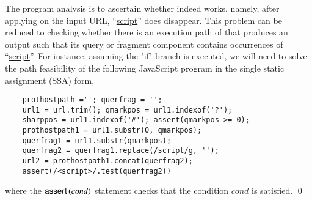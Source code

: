 \begin{example}
The program analysis is to ascertain whether {\urlxsssanitise} indeed works, namely, after applying {\urlxsssanitise} on the input URL, ``\url{script}'' does disappear.  This problem can be reduced to checking whether there is an execution path of {\urlxsssanitise} that produces an output such that its query or fragment component contains occurrences of ``\url{script}''. For instance, assuming  the "if" branch is executed, %
we will need to solve the path feasibility of the following JavaScript program in the single static assignment (SSA) form,

{\small
\begin{verbatim}
    prothostpath =''; querfrag = '';
    url1 = url.trim(); qmarkpos = url1.indexof('?');
    sharppos = url1.indexof('#'); assert(qmarkpos >= 0); 
    prothostpath1 = url1.substr(0, qmarkpos);
    querfrag1 = url1.substr(qmarkpos);
    querfrag2 = querfrag1.replace(/script/g, '');
    url2 = prothostpath1.concat(querfrag2);
    assert(/<script>/.test(querfrag2))
\end{verbatim}
}
where the $\textsf{assert}\left(cond\right)$ statement checks that the condition $cond$ is satisfied. \qed
\end{example}